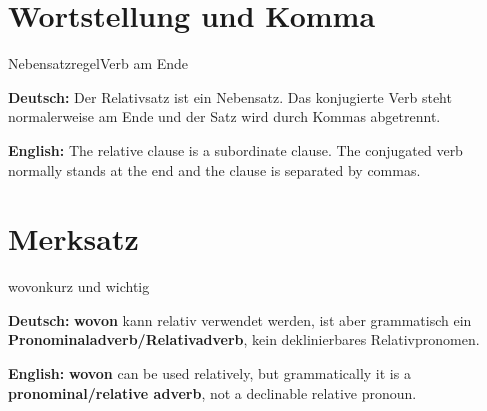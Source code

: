 \documentclass[a4paper,11pt]{article}
\newcommand{\GermanText}[1]{\textbf{Deutsch: }#1\par}
\newcommand{\EnglishText}[1]{{\small\color{SoftGray}\textbf{English: }#1\par}}
\begin{document}
\section{Wortstellung und Komma}

\begin{grammarentry}{Nebensatzregel}{Verb am Ende}

\GermanText{Der Relativsatz ist ein Nebensatz. Das konjugierte Verb steht normalerweise am Ende und der Satz wird durch Kommas abgetrennt.}

\EnglishText{The relative clause is a subordinate clause. The conjugated verb normally stands at the end and the clause is separated by commas.}

\end{grammarentry}

\section{Merksatz}

\begin{grammarentry}{wovon}{kurz und wichtig}

\GermanText{\textbf{wovon} kann relativ verwendet werden, ist aber grammatisch ein \textbf{Pronominaladverb/Relativadverb}, kein deklinierbares Relativpronomen.}

\EnglishText{\textbf{wovon} can be used relatively, but grammatically it is a \textbf{pronominal/relative adverb}, not a declinable relative pronoun.}

\end{grammarentry}
\end{document}
